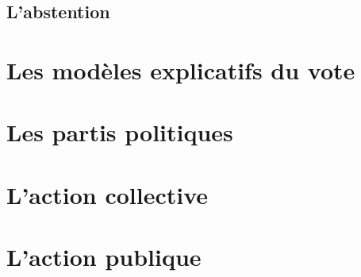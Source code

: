 \documentclass[12pt, a4paper, openany]{book}
\begin{document}
\section{L'abstention}



\chapter{Les modèles explicatifs du vote}







\chapter{Les partis politiques}






\chapter{L'action collective}







\chapter{L'action publique}
\end{document}

